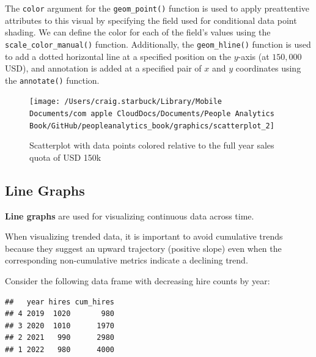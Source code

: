 \documentclass[
]{book}
\newenvironment{Shaded}{\begin{snugshade}}{\end{snugshade}}
\newcommand{\AttributeTok}[1]{\textcolor[rgb]{0.77,0.63,0.00}{#1}}
\newcommand{\CommentTok}[1]{\textcolor[rgb]{0.56,0.35,0.01}{\textit{#1}}}
\newcommand{\ConstantTok}[1]{\textcolor[rgb]{0.00,0.00,0.00}{#1}}
\newcommand{\FunctionTok}[1]{\textcolor[rgb]{0.00,0.00,0.00}{#1}}
\newcommand{\NormalTok}[1]{#1}
\newcommand{\SpecialCharTok}[1]{\textcolor[rgb]{0.00,0.00,0.00}{#1}}
\begin{document}
The \texttt{color} argument for the \texttt{geom\_point()} function is used to apply preattentive attributes to this visual by specifying the field used for conditional data point shading. We can define the color for each of the field's values using the \texttt{scale\_color\_manual()} function. Additionally, the \texttt{geom\_hline()} function is used to add a dotted horizontal line at a specified position on the \(y\)-axis (at \(150,000\) USD), and annotation is added at a specified pair of \(x\) and \(y\) coordinates using the \texttt{annotate()} function.

\begin{figure}

{\centering \texttt{[image: /Users/craig.starbuck/Library/Mobile Documents/com~apple~CloudDocs/Documents/People Analytics Book/GitHub/peopleanalytics\_book/graphics/scatterplot\_2]} 

}

\caption{Scatterplot with data points colored relative to the full year sales quota of USD 150k}\label{fig:scatterplot-2}
\end{figure}

\hypertarget{line-graphs}{%
\subsection{Line Graphs}\label{line-graphs}}

\textbf{Line graphs} are used for visualizing continuous data across time.

When visualizing trended data, it is important to avoid cumulative trends because they suggest an upward trajectory (positive slope) even when the corresponding non-cumulative metrics indicate a declining trend.

Consider the following data frame with decreasing hire counts by year:

\begin{Shaded}
\end{Shaded}

\begin{verbatim}
##   year hires cum_hires
## 4 2019  1020       980
## 3 2020  1010      1970
## 2 2021   990      2980
## 1 2022   980      4000
\end{verbatim}
\end{document}
